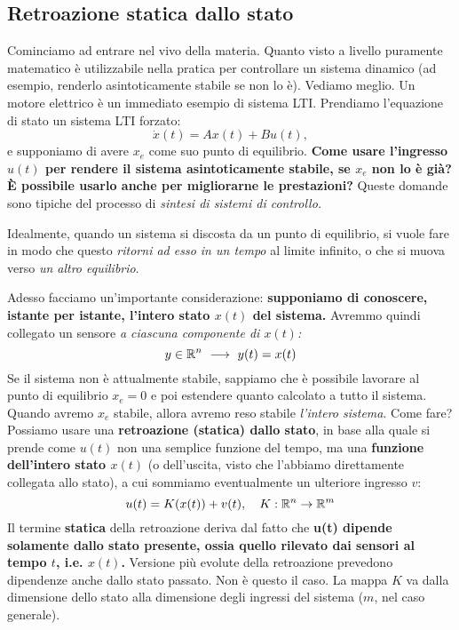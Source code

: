 \documentclass[a4paper]{report}
\begin{document}
\subsection{Retroazione statica dallo stato}
Cominciamo ad entrare nel vivo della materia. Quanto visto a livello puramente matematico è utilizzabile nella pratica per controllare un sistema dinamico (ad esempio, renderlo asintoticamente stabile se non lo è). Vediamo meglio. Un motore elettrico è un immediato esempio di sistema LTI.
\bb
Prendiamo l'equazione di stato un sistema LTI forzato:
 $$\dot x(t) = Ax(t) + Bu(t),$$ e supponiamo di avere $x_e$ come suo punto di equilibrio.  \textbf{Come usare l'ingresso $u(t)$ per rendere il sistema asintoticamente stabile, se $x_e$ non lo è già?} \textbf{È possibile usarlo anche per migliorarne  le prestazioni?} Queste domande sono tipiche del processo di \textit{sintesi di sistemi di controllo.} 
 \begin{lemma}
 	Idealmente, quando un sistema si discosta da un punto di equilibrio, si vuole fare in modo che questo \textit{ritorni ad esso in un tempo} al limite infinito, o che si muova verso \textit{un altro equilibrio}.
 \end{lemma}
\bb
Adesso facciamo un'importante considerazione: \textbf{supponiamo di conoscere, istante per istante, l'intero stato $x(t)$ del sistema.} Avremmo quindi collegato un sensore \textit{a ciascuna componente di $x(t)$:}
\begin{equation}
	y \in \mathbb{R}^n \ \longrightarrow \ y(t) = x(t) 
\end{equation}
Se il sistema non è attualmente stabile, sappiamo che è possibile lavorare al punto di equilibrio $x_e = 0$ e poi estendere quanto calcolato a tutto il sistema. Quando avremo $x_e$ stabile, allora avremo reso stabile \textit{l'intero sistema}. Come fare? Possiamo usare una \textbf{retroazione (statica) dallo stato}, in base alla quale si prende come $u(t)$ non una semplice funzione del tempo, ma una \textbf{funzione dell'intero stato $x(t)$} (o dell'uscita, visto che l'abbiamo direttamente collegata allo stato), a cui sommiamo eventualmente un ulteriore ingresso $v$:
\begin{equation}
	u(t) = K(x(t)) + v(t), \quad K : \mathbb{R}^n \rightarrow \mathbb{R}^m
\end{equation}
Il termine \textbf{statica} della retroazione deriva dal fatto che \textbf{u(t) dipende solamente dallo stato presente, ossia quello rilevato dai sensori al tempo $t$, i.e. $x(t)$.} Versione più evolute della retroazione prevedono dipendenze anche dallo stato passato. Non è questo il caso. La mappa $K$ va dalla dimensione dello stato alla dimensione degli ingressi del sistema ($m$, nel caso generale).
\end{document}

